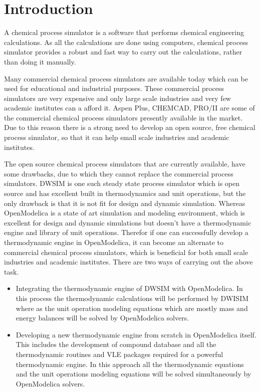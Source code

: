 \documentclass[12pt]{report}
\begin{document}
\chapter{Introduction}
A chemical process simulator is a software that performs chemical engineering calculations. As all the calculations are done using computers, chemical process simulator provides a robust and fast way to carry out the calculations, rather than doing it manually.

Many commercial chemical process simulators are available today which can be used for educational and industrial purposes. These commercial process simulators are very expensive and only large scale industries and very few academic institutes can a afford it. Aspen Plus, CHEMCAD, PRO/II are some of the commercial chemical process simulators presently available in the market. Due to this reason there is a strong need to develop an open source, free chemical process simulator, so that it can help small scale industries and academic institutes.

The open source chemical process simulators that are currently available, have some drawbacks, due to which they cannot replace the commercial process simulators. DWSIM is one such steady state process simulator which is open source and has excellent built in thermodynamics and unit operations, but the only drawback is that it is not fit for design and dynamic simulation. Whereas OpenModelica is a state of art simulation and modeling environment, which is excellent for design and dynamic simulations but doesn't have a thermodynamic engine and library of unit operations. Therefor if one can successfully develop a thermodynamic engine in OpenModelica, it can become an alternate to commercial chemical process simulators, which is beneficial for both small scale industries and academic institutes. There are two ways of carrying out the above task. 
\begin{itemize}
\item Integrating the thermodynamic engine of DWSIM with OpenModelica. In this process the thermodynamic calculations will be performed by DWISIM where as the unit operation modeling equations which are mostly mass and energy balances will be solved by OpenModelica solvers. 
\item Developing a new thermodynamic engine from scratch in OpenModelica itself. This includes the development of compound database and all the thermodynamic routines and VLE packages required for a powerful thermodynamic engine. In this approach all the thermodynamic equations and the unit operations modeling equations will be solved simultaneously by OpenModelica solvers.
\end{itemize}
\end{document}
